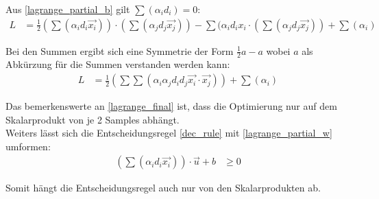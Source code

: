 \documentclass[a4paper,11pt,twoside]{scrreprt}
\begin{document}
Aus \autoref{lagrange_partial_b} gilt $\sum (\alpha_{i} d_{i}) = 0$:
\begin{equation} \label{lagrange_3}
    \begin{aligned}
    L &= \frac{1}{2} (\sum (\alpha_{i} d_{i} \vec{x_{i}})) \cdot (\sum (\alpha_{j} d_{j} \vec{x_{j}})) - \sum (\alpha_{i} d_{i} x_{i} \cdot (\sum (\alpha_{j} d_{j} \vec{x_{j}})) + \sum (\alpha_{i})
    \end{aligned}
\end{equation}

Bei den Summen ergibt sich eine Symmetrie der Form $\frac{1}{2} a - a$ wobei $a$ als Abkürzung für die Summen verstanden werden kann:
\begin{equation} \label{lagrange_final}
    \begin{aligned}
    L &= \frac{1}{2} (\sum \sum (\alpha_{i} \alpha_{j} d_{i} d_{j} \vec{x_{i}} \cdot \vec{x_{j}})) + \sum (\alpha_{i})
    \end{aligned}
\end{equation}

Das bemerkenswerte an \autoref{lagrange_final} ist, dass die Optimierung nur auf dem Skalarprodukt von je 2 Samples abhängt. \\

Weiters lässt sich die Entscheidungsregel \autoref{dec_rule} mit \autoref{lagrange_partial_w} umformen:
\begin{equation} \label{dec_rule}
    \begin{aligned}
    (\sum (\alpha_{i} d_{i} \vec{x_{i}})) \cdot \vec{u} + b & \geq 0 
    \end{aligned}
\end{equation}

Somit hängt die Entscheidungsregel auch nur von den Skalarprodukten ab.



\clearpage
{}
{}
\printbibliography
\end{document}

